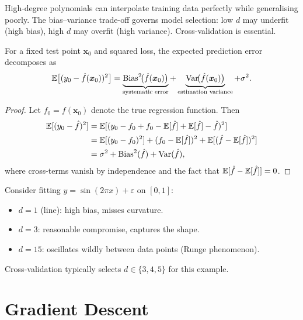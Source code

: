 \begin{warning}[title=\textbf{Overfitting Risk}]
High-degree polynomials can interpolate training data perfectly while generalising poorly. The bias--variance trade-off governs model selection: low $d$ may underfit (high bias), high $d$ may overfit (high variance). Cross-validation is essential.
\end{warning}

\begin{proposition}
For a fixed test point $\bm{x}_0$ and squared loss, the expected prediction error decomposes as
\[
    \mathbb{E}\bigl[(y_0 - \hat{f}(\bm{x}_0))^2\bigr]
    = \underbrace{\mathrm{Bias}^2\!\bigl(\hat{f}(\bm{x}_0)\bigr)}_{\text{systematic error}}
    + \underbrace{\mathrm{Var}\!\bigl(\hat{f}(\bm{x}_0)\bigr)}_{\text{estimation variance}}
    + \sigma^2.
\]
\end{proposition}

\begin{proof}
Let $f_0 = f(\bm{x}_0)$ denote the true regression function. Then
\begin{align*}
    \mathbb{E}[(y_0 - \hat{f})^2]
    &= \mathbb{E}[(y_0 - f_0 + f_0 - \mathbb{E}[\hat{f}] + \mathbb{E}[\hat{f}] - \hat{f})^2]\\
    &= \mathbb{E}[(y_0-f_0)^2] + (f_0-\mathbb{E}[\hat{f}])^2 + \mathbb{E}[(\hat{f}-\mathbb{E}[\hat{f}])^2]\\
    &= \sigma^2 + \mathrm{Bias}^2(\hat{f}) + \mathrm{Var}(\hat{f}),
\end{align*}
where cross-terms vanish by independence and the fact that $\mathbb{E}[\hat{f}-\mathbb{E}[\hat{f}]]=0$.
\end{proof}

\begin{example}
Consider fitting $y = \sin(2\pi x) + \varepsilon$ on $[0,1]$:
\begin{itemize}
    \item $d=1$ (line): high bias, misses curvature.
    \item $d=3$: reasonable compromise, captures the shape.
    \item $d=15$: oscillates wildly between data points (Runge phenomenon).
\end{itemize}
Cross-validation typically selects $d \in \{3,4,5\}$ for this example.
\end{example}

\section{Gradient Descent}

